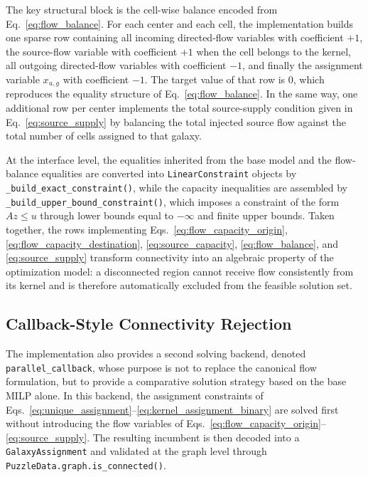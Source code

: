 The key structural block is the cell-wise balance encoded from
Eq.~\eqref{eq:flow_balance}. For each center and each cell, the implementation
builds one sparse row containing all incoming directed-flow variables with
coefficient \(+1\), the source-flow variable with coefficient \(+1\) when the
cell belongs to the kernel, all outgoing directed-flow variables with
coefficient \(-1\), and finally the assignment variable \(x_{u,g}\) with
coefficient \(-1\). The target value of that row is \(0\), which reproduces the
equality structure of Eq.~\eqref{eq:flow_balance}. In the same way, one
additional row per center implements the total source-supply condition given in
Eq.~\eqref{eq:source_supply} by balancing the total injected source flow
against the total number of cells assigned to that galaxy.

At the interface level, the equalities inherited from the base model and the
flow-balance equalities are converted into \texttt{LinearConstraint} objects by
\texttt{\_build\_exact\_constraint()}, while the capacity inequalities are
assembled by \texttt{\_build\_upper\_bound\_constraint()}, which imposes a
constraint of the form \(Az \leq u\) through lower bounds equal to
\(-\infty\) and finite upper bounds. Taken together, the rows implementing
Eqs.~\eqref{eq:flow_capacity_origin}, \eqref{eq:flow_capacity_destination},
\eqref{eq:source_capacity}, \eqref{eq:flow_balance}, and
\eqref{eq:source_supply} transform connectivity into an algebraic property of
the optimization model: a disconnected region cannot receive flow consistently
from its kernel and is therefore automatically excluded from the feasible
solution set.

\subsection{Callback-Style Connectivity Rejection}

The implementation also provides a second solving backend, denoted
\texttt{parallel\_callback}, whose purpose is not to replace the canonical
flow formulation, but to provide a comparative solution strategy based on the
base MILP alone. In this backend, the assignment constraints of
Eqs.~\eqref{eq:unique_assignment}--\eqref{eq:kernel_assignment_binary} are
solved first without introducing the flow variables of
Eqs.~\eqref{eq:flow_capacity_origin}--\eqref{eq:source_supply}. The resulting
incumbent is then decoded into a \texttt{GalaxyAssignment} and validated at the
graph level through \texttt{PuzzleData.graph.is\_connected()}.

